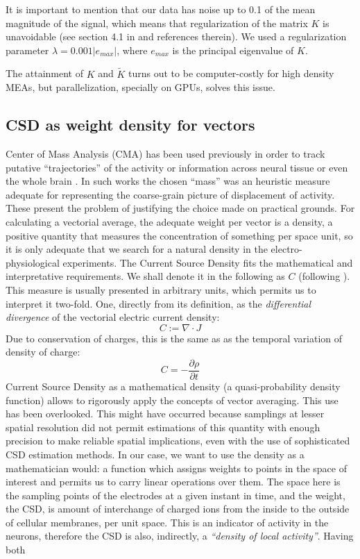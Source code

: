 \documentclass[utf8]{frontiersSCNS}
\begin{document}
It is important to mention that our data has noise up to 0.1 of the mean magnitude of the
signal, which means that regularization of the matrix $K$ is unavoidable (see section 4.1 in \citep{Potworowski2011} and references therein). We used a regularization parameter $\lambda=0.001 |e_{max}|$, where $e_{max}$ is the principal eigenvalue of $K$. 

The attainment of $K$ and $\tilde{K}$ turns out to be computer-costly for high density MEAs, but parallelization, specially on GPUs, solves this issue.


\subsection{CSD as weight density for vectors}


Center of Mass Analysis (CMA) has been used previously in order to track putative  ``trajectories'' of the activity or information across neural tissue or even the whole brain \citep{Chao05, Chao07, Manjarrez07, Manjarrez09}. In such works the chosen ``mass'' was an heuristic measure adequate for representing the coarse-grain picture of displacement of activity. These present the problem of justifying the choice made on practical grounds. For calculating a vectorial average, the adequate weight per vector is a density, a positive quantity that measures the concentration of something per space unit, so it is only adequate that we search for a natural density in the electro-physiological experiments. The Current Source Density fits the mathematical and interpretative requirements. We shall denote it in the following as $C$ (following \citep{Potworowski2011}).  This measure is usually presented in arbitrary units, which permits us to interpret it two-fold. One, directly from its definition, as the \emph{differential divergence} of the vectorial electric current density:
\begin{equation}
  C:=\nabla \cdot J
\end{equation}
Due to conservation of charges, this is the same as as the temporal variation of density of charge:
\begin{equation}
  C=-\frac{\partial \rho}{\partial t}
\end{equation}
Current Source Density as a mathematical density (a quasi-probability density function)  allows  to rigorously apply the concepts of vector averaging. This use has been overlooked. This might have occurred because  samplings at lesser spatial resolution did not permit estimations of this quantity with enough precision to make reliable spatial implications, even with the use of sophisticated CSD estimation methods. In our case, we want to use the density as a mathematician would: a function which assigns weights to points in the space of interest and permits us to carry linear operations over them.  The space here is the sampling points of the electrodes at a given instant in time, and the weight, the CSD, is amount of interchange of charged ions from the inside to the outside of cellular membranes, per unit space.  This is an indicator of activity in the neurons, therefore the CSD is also, indirectly, a \emph{``density of local activity''}. Having both
\end{document}
